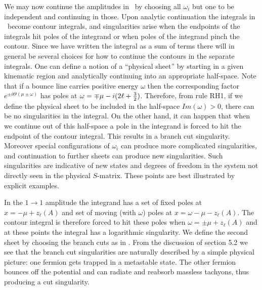 We may now continue the amplitudes in \fltfrm\ by choosing 
all $\omega_i$ but one to be independent and continuing
in those. 
Upon analytic continuation the integrals in \fltfrm\ become 
contour integrals, and singularities arise when the endpoints
of the integrals hit poles of the integrand or when poles of the 
integrand pinch the contour. Since we have written the integral 
as a sum of terms there will in general be several choices for how
to continue the contours in the separate integrals. One can 
define a notion of a ``physical sheet'' by starting in a given 
kinematic region and analytically continuing into an appropriate 
half-space. Note that if a bounce line carries positive 
energy $\omega$ then the corresponding factor 
$e^{\pm i\Theta(\mu\pm \omega)}$ has poles 
at $\omega=\mp \mu-i(2\ell+{3\over 2})$.
Therefore, from rule RH1, if we define the physical sheet to 
be included in the half-space
$Im(\omega)>0$, there can be no singularities in the integral.
On the other hand, it can happen that when we continue
out of this half-space a pole in the integrand 
is forced to hit the endpoint of the contour integral.
This results in a branch cut singularity. Moreover special 
configurations of $\omega_i$ can produce more complicated
singularities, and continuation to further sheets can produce 
new singularities. Such singularities are indicative of
new states and degrees of freedom in the system not directly seen 
in the physical $S$-matrix. These points are best illustrated by 
explicit examples. 
 
 
In the $1\to 1$ amplitude
\eqn{}
the integrand has a set of fixed poles at $x=-\mu+z_\ell(A)$ and 
set of moving (with $\omega$) poles at $x=\omega-\mu-z_\ell(A)$. The contour 
integral is therefore forced to hit these poles when 
$\omega=\pm \mu + z_\ell(A)$ and at these points the integral 
has a logarithmic singularity. We define the second sheet by 
choosing the branch cuts as in  
\fig{}.
From the discussion of section 5.2 we see that the branch cut
singularities are naturally described by a simple physical picture:
one fermion gets 
trapped in a metastable state. The other fermion bounces off
the potential and can radiate and reabsorb
massless tachyons, thus producing a cut singularity. 
 
